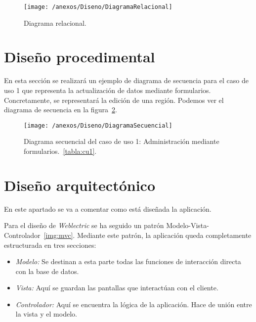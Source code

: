 \begin{figure}[h]
	\centering
	\texttt{[image: /anexos/Diseno/DiagramaRelacional]}
	\caption{Diagrama relacional.}
	\label{img:modeloRelacional}
\end{figure}

\newpage

\section{Diseño procedimental}

En esta sección se realizará un ejemplo de diagrama de secuencia para el caso de uso 1 que representa la actualización de datos mediante formularios. Concretamente, se representará la edición de una región. Podemos ver el diagrama de secuencia en la figura~\ref{img:modeloSecuencial}.

\begin{figure}[h]
	\centering
	\texttt{[image: /anexos/Diseno/DiagramaSecuencial]}
	\caption{Diagrama secuencial del caso de uso 1: Administración mediante formularios.~\ref{tabla:cu1}.}
	\label{img:modeloSecuencial}
\end{figure}

\newpage

\section{Diseño arquitectónico}

En este apartado se va a comentar como está diseñada la aplicación.

Para el diseño de \textit{Weblectric} se ha seguido un patrón Modelo-Vista-Controlador~\ref{img:mvc}. Mediante este patrón, la aplicación queda completamente estructurada en tres secciones:

\begin{itemize}
	
	\item \textit{Modelo:} Se destinan a esta parte todas las funciones de interacción directa con la base de datos.
	
	\item \textit{Vista:} Aquí se guardan las pantallas que interactúan con el cliente.
	
	\item \textit{Controlador:} Aquí se encuentra la lógica de la aplicación. Hace de unión entre la vista y el modelo.

\end{itemize}

